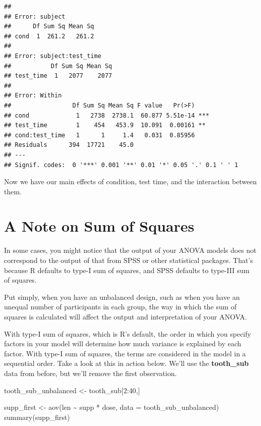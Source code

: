 \documentclass[
]{book}
\newenvironment{Shaded}{\begin{snugshade}}{\end{snugshade}}
\newcommand{\AttributeTok}[1]{\textcolor[rgb]{0.77,0.63,0.00}{#1}}
\newcommand{\DecValTok}[1]{\textcolor[rgb]{0.00,0.00,0.81}{#1}}
\newcommand{\FunctionTok}[1]{\textcolor[rgb]{0.00,0.00,0.00}{#1}}
\newcommand{\NormalTok}[1]{#1}
\newcommand{\OtherTok}[1]{\textcolor[rgb]{0.56,0.35,0.01}{#1}}
\newcommand{\SpecialCharTok}[1]{\textcolor[rgb]{0.00,0.00,0.00}{#1}}
\begin{document}
\begin{verbatim}
## 
## Error: subject
##      Df Sum Sq Mean Sq
## cond  1  261.2   261.2
## 
## Error: subject:test_time
##           Df Sum Sq Mean Sq
## test_time  1   2077    2077
## 
## Error: Within
##                 Df Sum Sq Mean Sq F value   Pr(>F)    
## cond             1   2738  2738.1  60.877 5.51e-14 ***
## test_time        1    454   453.9  10.091  0.00161 ** 
## cond:test_time   1      1     1.4   0.031  0.85956    
## Residuals      394  17721    45.0                     
## ---
## Signif. codes:  0 '***' 0.001 '**' 0.01 '*' 0.05 '.' 0.1 ' ' 1
\end{verbatim}

Now we have our main effects of condition, test time, and the interaction between them.

\hypertarget{a-note-on-sum-of-squares}{%
\section{A Note on Sum of Squares}\label{a-note-on-sum-of-squares}}

In some cases, you might notice that the output of your ANOVA models does not correspond to the output of that from SPSS or other statistical packages. That's because R defaults to type-I sum of squares, and SPSS defaults to type-III sum of squares.

Put simply, when you have an unbalanced design, such as when you have an unequal number of participants in each group, the way in which the sum of squares is calculated will affect the output and interpretation of your ANOVA.

With type-I sum of squares, which is R's default, the order in which you specify factors in your model will determine how much variance is explained by each factor. With type-I sum of squares, the terms are considered in the model in a sequential order. Take a look at this in action below. We'll use the \textbf{tooth\_sub} data from before, but we'll remove the first observation.

\begin{Shaded}
\begin{Highlighting}[]
\NormalTok{tooth\_sub\_unbalanced }\OtherTok{\textless{}{-}}\NormalTok{ tooth\_sub[}\DecValTok{2}\SpecialCharTok{:}\DecValTok{40}\NormalTok{,]}
\end{Highlighting}
\end{Shaded}

\begin{Shaded}
\begin{Highlighting}[]
\NormalTok{supp\_first }\OtherTok{\textless{}{-}} \FunctionTok{aov}\NormalTok{(len }\SpecialCharTok{\textasciitilde{}}\NormalTok{ supp }\SpecialCharTok{*}\NormalTok{ dose, }\AttributeTok{data =}\NormalTok{ tooth\_sub\_unbalanced)}
\FunctionTok{summary}\NormalTok{(supp\_first)}
\end{Highlighting}
\end{Shaded}
\end{document}
